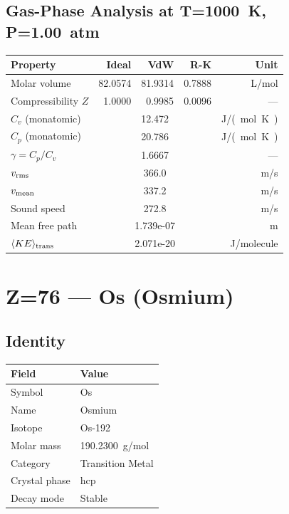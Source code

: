 \documentclass[11pt,a4paper]{article}
\begin{document}
\subsection{Gas-Phase Analysis at T=\SI{1000}{K}, P=\SI{1.00}{atm}}
\begin{tabular}{lrrrr}
  \toprule
  Property & Ideal & VdW & R-K & Unit \\
  \midrule
  Molar volume & 82.0574 & 81.9314 & 0.7888 & \si{L/mol} \\
  Compressibility $Z$ & 1.0000 & 0.9985 & 0.0096 & --- \\
  \midrule
  $C_v$ (monatomic) & \multicolumn{3}{c}{12.472} & \si{J/(mol.K)} \\
  $C_p$ (monatomic) & \multicolumn{3}{c}{20.786} & \si{J/(mol.K)} \\
  $\gamma = C_p/C_v$ & \multicolumn{3}{c}{1.6667} & --- \\
  $v_{\rm rms}$ & \multicolumn{3}{c}{366.0} & \si{m/s} \\
  $v_{\rm mean}$ & \multicolumn{3}{c}{337.2} & \si{m/s} \\
  Sound speed & \multicolumn{3}{c}{272.8} & \si{m/s} \\
  Mean free path & \multicolumn{3}{c}{1.739e-07} & \si{m} \\
  $\langle KE \rangle_{\rm trans}$ & \multicolumn{3}{c}{2.071e-20} & \si{J/molecule} \\
  \bottomrule
\end{tabular}

\newpage

\section{Z=76 --- Os (Osmium)}
\label{sec:Z76}

\subsection{Identity}
\begin{tabular}{ll}
  \toprule
  Field & Value \\
  \midrule
  Symbol & Os \\
  Name & Osmium \\
  Isotope & Os-192 \\
  Molar mass & \SI{190.2300}{g/mol} \\
  Category & Transition Metal \\
  Crystal phase & hcp \\
  Decay mode & Stable \\
  \bottomrule
\end{tabular}
\end{document}
